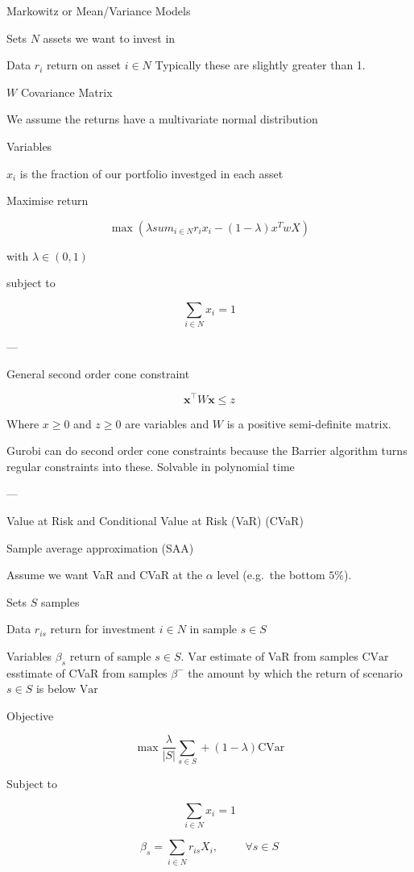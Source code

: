 Markowitz or Mean/Variance Models

Sets
$N$ assets we want to invest in

Data
$r_i$ return on asset $i \in N$
Typically these are slightly greater than 1.

$W$ Covariance Matrix

We assume the returns have a multivariate normal distribution

Variables

$x_i$ is the fraction of our portfolio investged in each asset

Maximise return

\[\max (\lambda sum_{i\in N} r_i x_i - (1-\lambda) x^T w X)\]

with
$\lambda \in (0,1)$

subject to

\[\sum_{i\in N} x_i = 1\]

---

General second order cone constraint

\[\boldsymbol{x}^\top W \boldsymbol{x} \le z\]

Where $x\ge 0$ and $z \ge 0$ are variables and $W$ is a positive semi-definite matrix.



Gurobi can do second order cone constraints because the Barrier algorithm turns regular constraints into these.
Solvable in polynomial time

---

Value at Risk and Conditional Value at Risk
(VaR) (CVaR)

Sample average approximation (SAA)

Assume we want VaR and CVaR at the $\alpha$ level (e.g.\ the bottom $5\%$).

Sets
$S$ samples

Data
$r_{is}$ return for investment $i \in N$ in sample $s \in S$

Variables
$\beta_s$ return of sample $s \in S$.
$\text{Var}$ estimate of VaR from samples
$\text{CVar}$ esstimate of CVaR from samples
$\beta^{-}$ the amount by which the return of scenario $s \in S$ is below $\text{Var}$

Objective

\[ \max \frac{\lambda}{|S|} \sum_{s \in S} + (1 - \lambda)\text{CVar} \]

Subject to

\[ \sum_{i\in N} x_i = 1 \]

\[ \beta_s = \sum_{ i \in N } r_{is} X_i, \hspace{1cm} \forall s \in S \]

